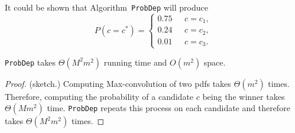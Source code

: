 \begin{comment}
If we observe the bounds of these three candidates without calculating exact probabilities, we can estimate that \( c_2 \) is less likely to achieve the highest score compared to the others. While unknown questions could potentially impact the outcome, common unknown questions between candidates will affect all candidates similarly and are not game-changers in this case. Therefore, when we exclude their influence, \( P(c_2 = c^*) \) becomes even lower. This is reasonable, as unknown common questions cannot help \( c_2 \) exceed its score relative to the others.    


\begin{figure}[ht]
    \centering
    \texttt{[image: figures/PDF.jpg]}
    \caption{Probability Distribution of the winner candidate}
    \label{fig:PDF}
\end{figure}

One challenge in calculating these probabilities involve quantifying the effect of common elements and disregarding their effect in the final probability value. \textcolor{red}{As an example, }
\end{comment}


It could be shown that Algorithm~{\tt ProbDep} will produce
\[
P(c = c^*) =
\begin{cases} 
0.75 & \text{ } c = c_1, \\
0.24 & \text{ } c = c_2, \\
0.01 & \text{ } c = c_3.
\end{cases}
\]


 \begin{lemma}
 {\tt ProbDep} takes $\Theta(M^2m^2)$ running time and $O(m^2)$ space.
 \end{lemma}

\begin{proof}
(sketch.) Computing Max-convolution of two pdfs takes $\Theta(m^2)$ times. Therefore, computing the probability of a candidate $c$ being the winner takes $\Theta(Mm^2)$ time.  {\tt ProbDep} repeats this process on each candidate and therefore takes $\Theta(M^2m^2)$ times.
\end{proof}


